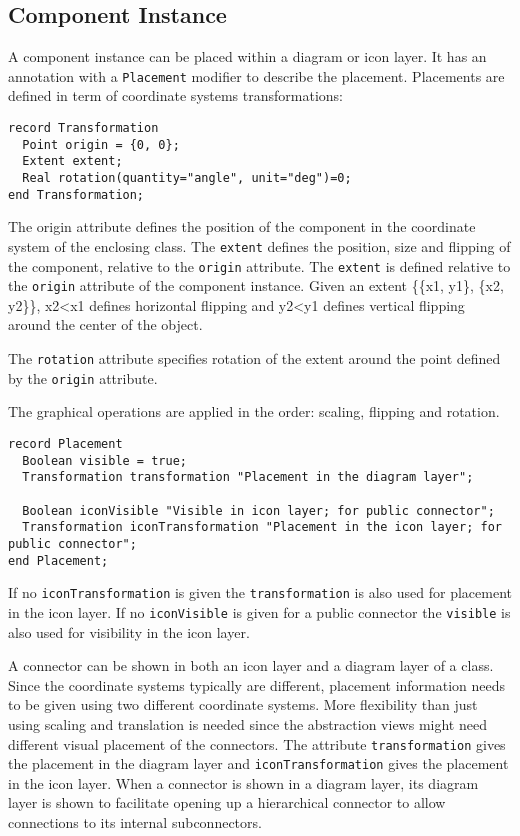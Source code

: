 \subsection{Component Instance}

A component instance can be placed within a diagram or icon layer. It
has an annotation with a \lstinline!Placement! modifier to describe the placement.
Placements are defined in term of coordinate systems transformations:

\begin{lstlisting}[language=modelica]
record Transformation
  Point origin = {0, 0};
  Extent extent;
  Real rotation(quantity="angle", unit="deg")=0;
end Transformation;
\end{lstlisting}
The origin attribute defines the position of the component in the
coordinate system of the enclosing class. The \lstinline!extent! defines the
position, size and flipping of the component, relative to the \lstinline!origin!
attribute. The \lstinline!extent! is defined relative to the \lstinline!origin! attribute of the
component instance. Given an extent \{\{x1, y1\}, \{x2, y2\}\},
x2\textless{}x1 defines horizontal flipping and y2\textless{}y1 defines
vertical flipping around the center of the object.

The \lstinline!rotation! attribute specifies rotation of the extent around the point
defined by the \lstinline!origin! attribute.

The graphical operations are applied in the order: scaling, flipping and
rotation.

\begin{lstlisting}[language=modelica]
record Placement
  Boolean visible = true;
  Transformation transformation "Placement in the diagram layer";

  Boolean iconVisible "Visible in icon layer; for public connector";
  Transformation iconTransformation "Placement in the icon layer; for public connector";
end Placement;
\end{lstlisting}
If no \lstinline!iconTransformation! is given the \lstinline!transformation! is also used for
placement in the icon layer. If no \lstinline!iconVisible! is given for a public connector the
\lstinline!visible! is also used for visibility in the icon layer.

\begin{nonnormative}
A connector can be shown in both an icon layer and a diagram
layer of a class. Since the coordinate systems typically are different,
placement information needs to be given using two different coordinate
systems. More flexibility than just using scaling and translation is
needed since the abstraction views might need different visual placement
of the connectors. The attribute \lstinline!transformation! gives the placement in
the diagram layer and \lstinline!iconTransformation! gives the placement in the icon
layer. When a connector is shown in a diagram layer, its diagram layer
is shown to facilitate opening up a hierarchical connector to allow
connections to its internal subconnectors.
\end{nonnormative}

